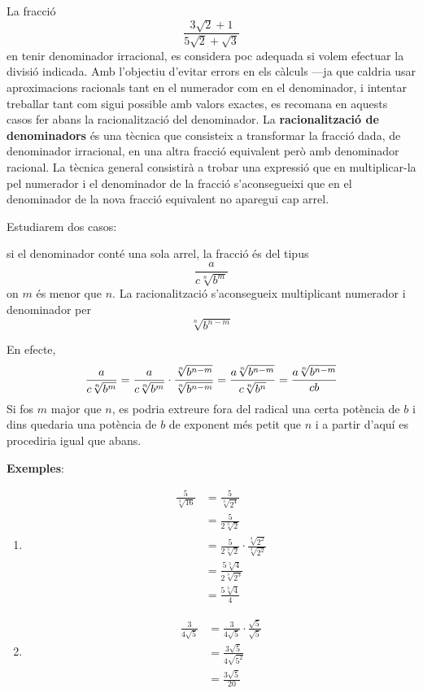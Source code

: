La fracció%
\begin{equation*}
\frac{3\sqrt{2}+1}{5\sqrt{2}+\sqrt{3}}
\end{equation*}%
en tenir denominador irracional, es considera poc
adequada si volem efectuar la divisió indicada. Amb l’objectiu d’evitar errors en els càlculs —ja que caldria usar aproximacions
racionals tant en el numerador com en el denominador, i intentar treballar
tant com sigui possible amb valors exactes, es recomana en aquests casos
fer abans la racionalització del denominador. La \textbf{%
racionalització de denominadors} és una tècnica que consisteix a
transformar la fracció dada, de denominador irracional, en una altra
fracció equivalent però amb denominador racional. La tècnica general
consistirà a trobar una expressió que en multiplicar-la pel
numerador i el denominador de la fracció s’aconsegueixi que en el
denominador de la nova fracció equivalent no aparegui cap arrel.

Estudiarem dos casos:

\begin{cas}
si el denominador conté una sola arrel, la fracció és del tipus%
\begin{equation*}
\frac{a}{c\sqrt[n]{b^{m}}}
\end{equation*}%
on $m$ és menor que $n$. La racionalització s’aconsegueix
multiplicant numerador i denominador per%
\begin{equation*}
\sqrt[n]{b^{n-m}}
\end{equation*}
\end{cas}

En efecte,%
\begin{equation*}
\frac{a}{c\sqrt[n]{b^{m}}}=\frac{a}{c\sqrt[n]{b^{m}}}\cdot \frac{\sqrt[n]{%
b^{n-m}}}{\sqrt[n]{b^{n-m}}}=\frac{a\sqrt[n]{b^{n-m}}}{c\sqrt[n]{b^{n}}}=%
\frac{a\sqrt[n]{b^{n-m}}}{cb}
\end{equation*}%
Si fos $m$ major que $n$, es podria extreure fora del radical una
certa potència de $b$ i dins quedaria una potència de $b$ de
exponent més petit que $n$ i a partir d’aquí es procediria igual que abans.

\textbf{Exemples}:

\begin{enumerate}
\item 
\begin{align*}
\frac{5}{\sqrt[3]{16}} &=\frac{5}{\sqrt[3]{2^{4}}} \\
&=\frac{5}{2\sqrt[3]{2}} \\
&=\frac{5}{2\sqrt[3]{2}}\cdot \frac{\sqrt[3]{2^{2}}}{\sqrt[3]{2^{2}}} \\
&=\frac{5\sqrt[3]{4}}{2\sqrt[3]{2^{3}}} \\
&=\frac{5\sqrt[3]{4}}{4}
\end{align*}

\item 
\begin{align*}
\frac{3}{4\sqrt{5}} &=\frac{3}{4\sqrt{5}}\cdot \frac{\sqrt{5}}{\sqrt{5}} \\
&=\frac{3\sqrt{5}}{4\sqrt{5^{2}}} \\
&=\frac{3\sqrt{5}}{20}
\end{align*}
\end{enumerate}

